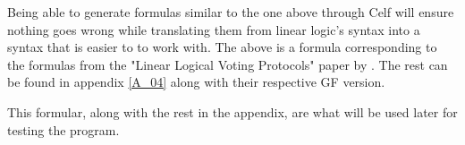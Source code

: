 Being able to generate formulas similar to the one above through Celf will ensure nothing goes wrong while translating them from linear logic's syntax into a syntax that is easier to to work with. The above is a formula corresponding to the formulas from the "{L}inear {L}ogical {V}oting {P}rotocols" paper by \citeauthor{Deyoung11}. The rest can be found in appendix \ref{A_04} along with their respective GF version.

This formular, along with the rest in the appendix, are what will be used later for testing the program.